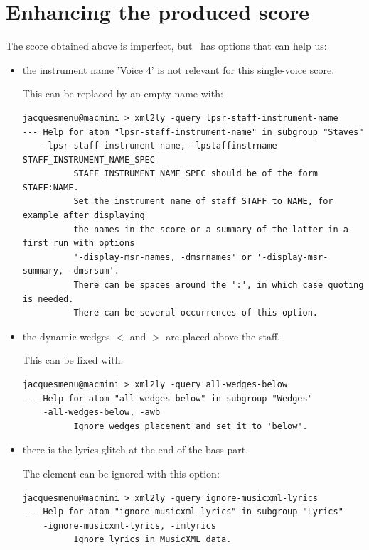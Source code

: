 \section{Enhancing the produced score}

The score obtained above is imperfect, but \xmlToLy\ has options that can help us:
\begin{itemize}
\item the instrument name 'Voice 4' is not relevant for this single-voice score.

		This can be replaced by an empty name with:
\begin{lstlisting}[language=Terminal]
jacquesmenu@macmini > xml2ly -query lpsr-staff-instrument-name
--- Help for atom "lpsr-staff-instrument-name" in subgroup "Staves"
    -lpsr-staff-instrument-name, -lpstaffinstrname STAFF_INSTRUMENT_NAME_SPEC
          STAFF_INSTRUMENT_NAME_SPEC should be of the form STAFF:NAME.
          Set the instrument name of staff STAFF to NAME, for example after displaying
          the names in the score or a summary of the latter in a first run with options
          '-display-msr-names, -dmsrnames' or '-display-msr-summary, -dmsrsum'.
          There can be spaces around the ':', in which case quoting is needed.
          There can be several occurrences of this option.
\end{lstlisting}

\item the dynamic wedges $<$ and $>$ are placed above the staff.

	This can be fixed with:
\begin{lstlisting}[language=Terminal]
jacquesmenu@macmini > xml2ly -query all-wedges-below
--- Help for atom "all-wedges-below" in subgroup "Wedges"
    -all-wedges-below, -awb
          Ignore wedges placement and set it to 'below'.
\end{lstlisting}

\item there is the lyrics glitch at the end of the bass part.

The  element can be ignored with this option:
\begin{lstlisting}[language=Terminal]
jacquesmenu@macmini > xml2ly -query ignore-musicxml-lyrics
--- Help for atom "ignore-musicxml-lyrics" in subgroup "Lyrics"
    -ignore-musicxml-lyrics, -imlyrics
          Ignore lyrics in MusicXML data.
\end{lstlisting}
\end{itemize}

